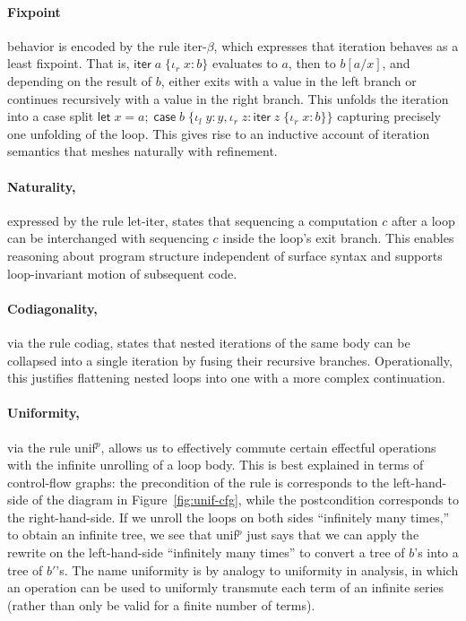 \documentclass[acmsmall,screen,review]{acmart}
\newcommand{\ms}[1]{\ensuremath{\mathsf{#1}}}
\newcommand{\lto}{:}
\newcommand{\linl}[1]{\iota_l\;{#1}}
\newcommand{\linr}[1]{\iota_r\;{#1}}
\newcommand{\letexpr}[3]{\ensuremath{\ms{let}\;#1 = #2;\;#3}}
\newcommand{\caseexpr}[5]{\ms{case}\;#1\;\{\linl{#2} \lto #3, \linr{#4} \lto #5\}}
\newcommand{\liter}[3]{\ms{iter}\;#1\;\{ \linr{#2} \lto #3 \}}
\begin{document}
\paragraph{Fixpoint} behavior is encoded by the rule \textsf{iter-$\beta$}, which expresses that
iteration behaves as a least fixpoint. That is, $\liter{a}{x}{b}$ evaluates to $a$, then to
$b[a/x]$, and depending on the result of $b$, either exits with a value in the left branch or
continues recursively with a value in the right branch. This unfolds the iteration into a case
split
$
\letexpr{x}{a}{\caseexpr{b}{y}{y}{z}{\liter{z}{x}{b}}}
$
capturing precisely one unfolding of the loop. This gives rise to an inductive account of iteration
semantics that meshes naturally with refinement.
%
\paragraph{Naturality,} expressed by the rule \textsf{let-iter}, states that sequencing a
computation $c$ after a loop can be interchanged with sequencing $c$ inside the loop’s exit branch.
This enables reasoning about program structure independent of surface syntax and supports
loop-invariant motion of subsequent code.
%
\paragraph{Codiagonality,} via the rule \textsf{codiag}, states that nested iterations of the same
body can be collapsed into a single iteration by fusing their recursive branches. Operationally,
this justifies flattening nested loops into one with a more complex continuation.
%
\paragraph{Uniformity,} via the rule \textsf{unif$^p$}, allows us to effectively commute certain
effectful operations with the infinite unrolling of a loop body. This is best explained in terms of
control-flow graphs: the precondition of the rule is corresponds to the left-hand-side of the
diagram in Figure~\ref{fig:unif-cfg}, while the postcondition corresponds to the right-hand-side. If
we unroll the loops on both sides ``infinitely many times,'' to obtain an infinite tree, we see that
\textsf{unif$^p$} just says that we can apply the rewrite on the left-hand-side ``infinitely many
times'' to convert a tree of $b$'s into a tree of $b'$'s. The name uniformity is by analogy to
uniformity in analysis, in which an operation can be used to uniformly transmute each term of an
infinite series (rather than only be valid for a finite number of terms).
\end{document}
